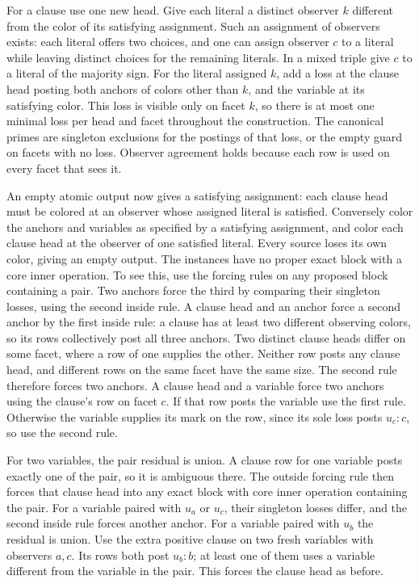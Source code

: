 For a clause use one new head. Give each literal a
distinct observer $k$ different from the color of
its satisfying assignment. Such an assignment of
observers exists: each literal offers two choices,
and one can assign observer $c$ to a literal while
leaving distinct choices for the remaining literals.
In a mixed triple give $c$ to a literal of the
majority sign. For the literal assigned
$k$, add a loss at the clause head posting both
anchors of colors other than $k$, and the variable
at its satisfying color. This loss is visible only
on facet $k$, so there is at most one minimal
loss per head and facet throughout the construction.
The canonical primes are singleton exclusions for
the postings of that loss, or the empty guard on
facets with no loss. Observer agreement holds
because each row is used on every facet that sees it.

An empty atomic output now gives a satisfying
assignment: each clause head must be colored at
an observer whose assigned literal is satisfied.
Conversely color the anchors and variables as
specified by a satisfying assignment, and color
each clause head at the observer of one satisfied
literal. Every source loses its own color, giving
an empty output. The instances have no proper exact block with a
core inner operation. To see this, use the forcing
rules on any proposed block containing a pair.
Two anchors force the third by comparing their
singleton losses, using the second inside rule.
A clause head and an anchor force a second anchor
by the first inside rule: a clause has at least two
different observing colors, so its rows collectively
post all three anchors. Two distinct clause heads
differ on some facet, where a row of one supplies
the other. Neither row posts any clause head, and
different rows on the same facet have the same size.
The second rule therefore forces two anchors.
A clause head and a variable force two anchors
using the clause's row on facet $c$. If that row
posts the variable use the first rule. Otherwise
the variable supplies its mark on the row, since
its sole loss posts $u_c:c$, so use the second rule.

For two variables, the pair residual is union.
A clause row for one variable posts exactly one
of the pair, so it is ambiguous there. The outside
forcing rule then forces that clause head into
any exact block with core inner operation containing
the pair. For a variable paired with $u_a$ or $u_c$,
their singleton losses differ, and the second
inside rule forces another anchor. For a variable
paired with $u_b$ the residual is union. Use the extra positive
clause on two fresh variables with observers $a,c$.
Its rows both post $u_b:b$; at least one of them
uses a variable different from the variable in
the pair. This forces the clause head as before.

